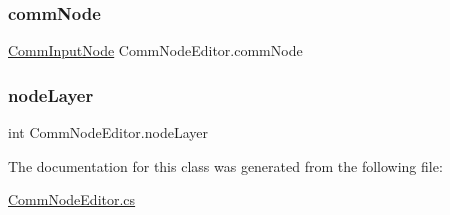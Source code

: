 \subsubsection{\texorpdfstring{comm\+Node}{commNode}}
{\footnotesize\ttfamily \mbox{\hyperlink{class_comm_input_node}{Comm\+Input\+Node}} Comm\+Node\+Editor.\+comm\+Node}

\mbox{\label{class_comm_node_editor_a23b382bbd6d5fc07966f04e09bd75093}} 
\subsubsection{\texorpdfstring{node\+Layer}{nodeLayer}}
{\footnotesize\ttfamily int Comm\+Node\+Editor.\+node\+Layer}



The documentation for this class was generated from the following file\+:\begin{DoxyCompactItemize}
\item 
\mbox{\hyperlink{_comm_node_editor_8cs}{Comm\+Node\+Editor.\+cs}}\end{DoxyCompactItemize}
